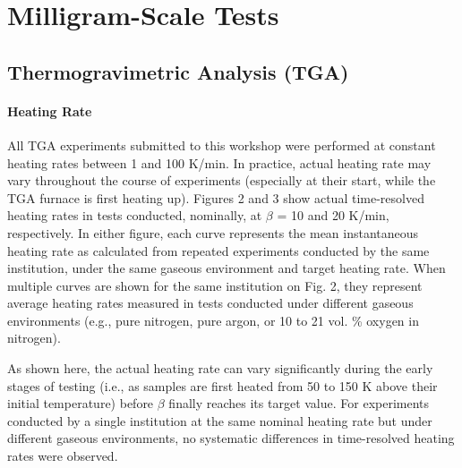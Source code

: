 \documentclass{book}
\begin{document}
\section{Milligram-Scale Tests}

\subsection{Thermogravimetric Analysis (TGA)}

\paragraph{Heating Rate}

All TGA experiments submitted to this workshop were performed at constant heating rates between 1 and 100 K/min. In practice, actual heating rate may vary throughout the course of experiments (especially at their start, while the TGA furnace is first heating up). Figures 2 and 3 show actual time-resolved heating rates in tests conducted, nominally, at $\beta$ = 10 and 20 K/min, respectively. In either figure, each curve represents the mean instantaneous heating rate as calculated from repeated experiments conducted by the same institution, under the same gaseous environment and target heating rate. When multiple curves are shown for the same institution on Fig. 2, they represent average heating rates measured in tests conducted under different gaseous environments (e.g., pure nitrogen, pure argon, or 10 to 21 vol. \% oxygen in nitrogen).

As shown here, the actual heating rate can vary significantly during the early stages of testing (i.e., as samples are first heated from 50 to 150 K above their initial temperature) before $\beta$ finally reaches its target value. For experiments conducted by a single institution at the same nominal heating rate but under different gaseous environments, no systematic differences in time-resolved heating rates were observed.
\end{document}
